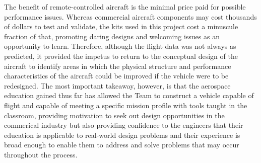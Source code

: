\documentclass[titlepage]{article}
\begin{document}
The benefit of remote-controlled aircraft is the minimal price paid for possible performance issues. Whereas commercial aircraft components may cost thousands of dollars to test and validate, the kits used in this project cost a minuscule fraction of that, promoting daring designs and welcoming issues as an opportunity to learn. Therefore, although the flight data was not always as predicted, it provided the impetus to return to the conceptual design of the aircraft to identify areas in which the physical structure and performance characteristics of the aircraft could be improved if the vehicle were to be redesigned. The most important takeaway, however, is that the aerospace education gained thus far has allowed the Team to construct a vehicle capable of flight and capable of meeting a specific mission profile with tools taught in the classroom, providing motivation to seek out design opportunities in the commerical industry but also providing confidence to the engineers that their education is applicable to real-world design problems and their experience is broad enough to enable them to address and solve problems that may occur throughout the process.

\newpage
\end{document}
